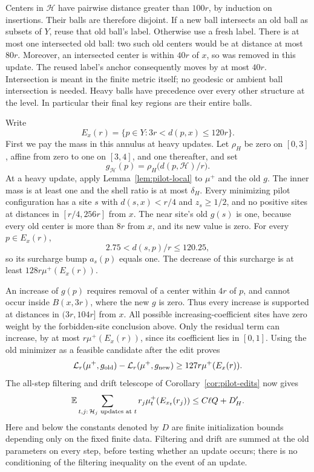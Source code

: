 Centers in \(\mathcal H\) have pairwise distance greater than \(100r\),
by induction on insertions.  Their balls are therefore disjoint.  If a new
ball intersects an old ball as subsets of \(Y\), reuse that old ball's
label.  Otherwise use a fresh label.  There is at most one intersected old
ball: two such old centers would be at distance at most \(80r\).  Moreover,
an intersected center is within \(40r\) of \(x\), so was removed in this
update.  The reused label's anchor consequently moves by at most \(40r\).
Intersection is meant in the finite metric itself; no geodesic or ambient
ball intersection is needed.  Heavy balls have precedence over every other
structure at the level.  In particular their final key regions are their
entire balls.

Write
\[
 E_x(r)=\{p\in Y:3r<d(p,x)\le120r\}.
\]
First we pay the mass in this annulus at heavy updates.  Let \(\rho_H\)
be zero on \([0,3]\), affine from zero to one on \([3,4]\), and one
thereafter, and set
\[
 g_{\mathcal H}(p)=\rho_H\bigl(d(p,\mathcal H)/r\bigr).
\]
At a heavy update, apply Lemma~\ref{lem:pilot-local} to \(\mu^+\) and
the old \(g\).  The inner mass is at least one and the shell ratio is at
most \(\delta_H\).  Every minimizing pilot configuration has a site
\(s\) with \(d(s,x)<r/4\) and \(z_s\ge1/2\), and no positive sites
at distances in \([r/4,256r]\) from \(x\).  The near site's old \(g(s)\)
is one, because every old center is more than \(8r\) from \(x\), and
its new value is zero.  For every \(p\in E_x(r)\),
\[
 2.75<d(s,p)/r\le120.25,
\]
so its surcharge bump \(a_s(p)\) equals one.  The decrease of this
surcharge is at least \(128r\mu^+(E_x(r))\).

An increase of \(g(p)\) requires removal of a center within \(4r\) of
\(p\), and cannot occur inside \(B(x,3r)\), where the new \(g\) is zero.
Thus every increase is supported at distances in \((3r,104r]\) from
\(x\).  All possible increasing-coefficient sites have zero weight by
the forbidden-site conclusion above.  Only the residual term can increase,
by at most \(r\mu^+(E_x(r))\), since its coefficient lies in \([0,1]\).
Using the old minimizer as a feasible candidate after the edit proves
\[
 \mathcal L_r(\mu^+,g_{\rm old})
 -\mathcal L_r(\mu^+,g_{\rm new})
 \ge127r\mu^+(E_x(r)).
\]
The all-step filtering and drift telescope of
Corollary~\ref{cor:pilot-edits} now gives
\begin{equation}\label{eq:heavy-annulus-budget}
 \mathbb E\sum_{t,j:\,\mathcal H_j\text{ updates at }t}
 r_j\mu_t^+(E_{x_t}(r_j))
 \le C\ell Q+D_H'.
\end{equation}
Here and below the constants denoted by \(D\) are finite initialization
bounds depending only on the fixed finite data.  Filtering and drift are
summed at the old parameters on every step, before testing whether an
update occurs; there is no conditioning of the filtering inequality on
the event of an update.

